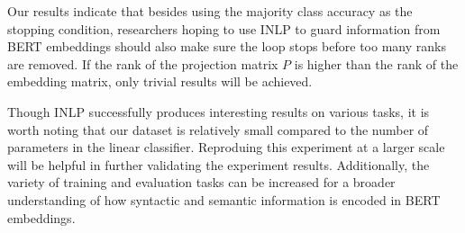\documentclass[11pt,a4paper]{article}
\begin{document}
Our results indicate that besides using the majority class accuracy as the stopping condition, researchers hoping to use INLP to guard information from BERT embeddings should also make sure the loop stops before too many ranks are removed. If the rank of the projection matrix $P$ is higher than the rank of the embedding matrix, only trivial results will be achieved.

Though INLP successfully produces interesting results on various tasks, it is worth noting that our dataset is relatively small compared to the number of parameters in the linear classifier. Reproduing this experiment at a larger scale will be helpful in further validating the experiment results. Additionally, the variety of training and evaluation tasks can be increased for a broader understanding of how syntactic and semantic information is encoded in BERT embeddings.


















\end{document}

